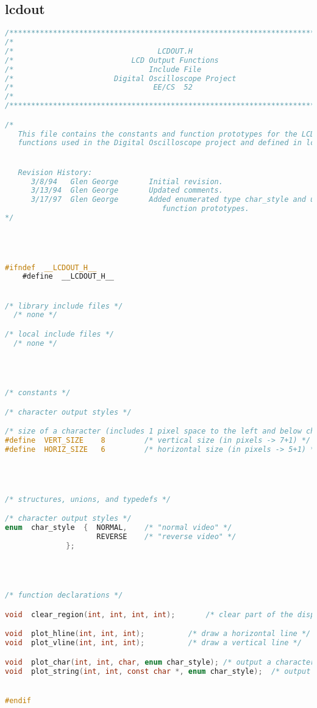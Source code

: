 \subsection{lcdout}
\begin{lstlisting}[language=C]
/****************************************************************************/
/*                                                                          */
/*                                 LCDOUT.H                                 */
/*                           LCD Output Functions                           */
/*                               Include File                               */
/*                       Digital Oscilloscope Project                       */
/*                                EE/CS  52                                 */
/*                                                                          */
/****************************************************************************/

/*
   This file contains the constants and function prototypes for the LCD output
   functions used in the Digital Oscilloscope project and defined in lcdout.c.


   Revision History:
      3/8/94   Glen George       Initial revision.
      3/13/94  Glen George       Updated comments.
      3/17/97  Glen George       Added enumerated type char_style and updated
                                    function prototypes.
*/




#ifndef  __LCDOUT_H__
    #define  __LCDOUT_H__


/* library include files */
  /* none */

/* local include files */
  /* none */




/* constants */

/* character output styles */

/* size of a character (includes 1 pixel space to the left and below character) */
#define  VERT_SIZE    8         /* vertical size (in pixels -> 7+1) */
#define  HORIZ_SIZE   6         /* horizontal size (in pixels -> 5+1) */




/* structures, unions, and typedefs */

/* character output styles */
enum  char_style  {  NORMAL,    /* "normal video" */
                     REVERSE	/* "reverse video" */
	          };




/* function declarations */

void  clear_region(int, int, int, int);		  /* clear part of the display */

void  plot_hline(int, int, int);		  /* draw a horizontal line */
void  plot_vline(int, int, int);		  /* draw a vertical line */

void  plot_char(int, int, char, enum char_style); /* output a character */
void  plot_string(int, int, const char *, enum char_style);  /* output a string */


#endif
\end{lstlisting}

